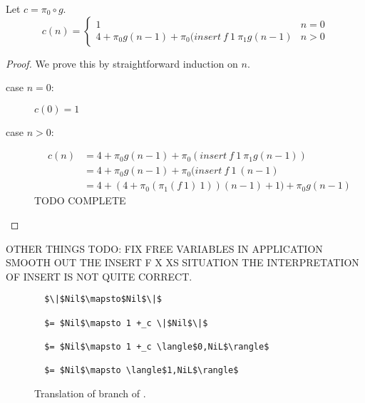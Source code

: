 Let $c = \pi_0 \circ g$.
\begin{equation}
  \label{eq:sort_rec_cost}
  c(n) = \begin{cases}
    1 & n=0 \\
    4 + \pi_0 g(n-1) + \pi_0 (insert\ f\ 1\ \pi_1g(n-1) & n > 0
  \end{cases}
\end{equation}

\begin{theorem}
  \label{thm:sort_cost}
\end{theorem}
\begin{proof}
  We prove this by straightforward induction on $n$.
  \begin{description}
    \item[case $n=0$:] $c(0) = 1$
    \item[case $n>0$:]
      \begin{align*}
        c(n) &= 4 + \pi_0 g(n-1) + \pi_0(insert\ f\ 1\ \pi_1g(n-1)) \\
        &= 4 + \pi_0 g(n-1) + \pi_0(insert\ f\ 1\ (n-1) \\
        &= 4 + (4 + \pi_0(\pi_1(f\ 1)\ 1))(n-1) + 1) + \pi_0 g(n-1)
      \end{align*}
      TODO COMPLETE
  \end{description}
\end{proof}

OTHER THINGS TODO:
FIX FREE VARIABLES IN APPLICATION
SMOOTH OUT THE INSERT F X XS SITUATION
THE INTERPRETATION OF INSERT IS NOT QUITE CORRECT.



\begin{figure}[H]
  \caption{Translation of  branch of .}
  \label{fig:sort_nil}
  \begin{lstlisting}
  $\|$Nil$\mapsto$Nil$\|$

  $= $Nil$\mapsto 1 +_c \|$Nil$\|$

  $= $Nil$\mapsto 1 +_c \langle$0,NiL$\rangle$

  $= $Nil$\mapsto \langle$1,NiL$\rangle$
  \end{lstlisting}
\end{figure}

